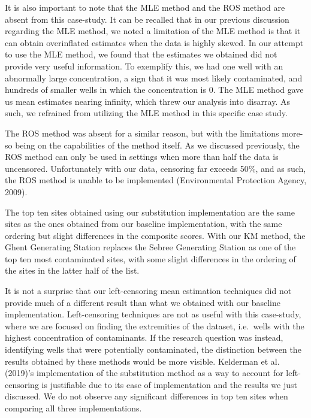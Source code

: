 \documentclass[12pt, twoside]{amherstthesis}
\begin{document}
It is also important to note that the MLE method and the ROS method are absent from this case-study. It can be recalled that in our previous discussion regarding the MLE method, we noted a limitation of the MLE method is that it can obtain overinflated estimates when the data is highly skewed. In our attempt to use the MLE method, we found that the estimates we obtained did not provide very useful information. To exemplify this, we had one well with an abnormally large concentration, a sign that it was most likely contaminated, and hundreds of smaller wells in which the concentration is 0. The MLE method gave us mean estimates nearing infinity, which threw our analysis into disarray. As such, we refrained from utilizing the MLE method in this specific case study.

The ROS method was absent for a similar reason, but with the limitations more-so being on the capabilities of the method itself. As we discussed previously, the ROS method can only be used in settings when more than half the data is uncensored. Unfortunately with our data, censoring far exceeds 50\%, and as such, the ROS method is unable to be implemented (Environmental Protection Agency, 2009).

The top ten sites obtained using our substitution implementation are the same sites as the ones obtained from our baseline implementation, with the same ordering but slight differences in the composite scores. With our KM method, the Ghent Generating Station replaces the Sebree Generating Station as one of the top ten most contaminated sites, with some slight differences in the ordering of the sites in the latter half of the list.

It is not a surprise that our left-censoring mean estimation techniques did not provide much of a different result than what we obtained with our baseline implementation. Left-censoring techniques are not as useful with this case-study, where we are focused on finding the extremities of the dataset, i.e.~wells with the highest concentration of contaminants. If the research question was instead, identifying wells that were potentially contaminated, the distinction between the results obtained by these methods would be more visible. Kelderman et al. (2019)'s implementation of the substitution method as a way to account for left-censoring is justifiable due to its ease of implementation and the results we just discussed. We do not observe any significant differences in top ten sites when comparing all three implementations.
\end{document}
